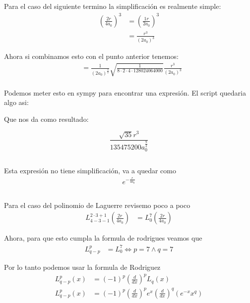 \documentclass{report}
\begin{document}
\subsection{}

Para el caso del siguiente termino la simplificación es realmente simple:
\begin{align*}
	\left( \frac{2 r}{4 a_0} \right)^3 &= \left( \frac{1 r}{2 a_0} \right)^3\\
	&= \frac{r^3}{\left( 2 a_0 \right)^{3}}
\end{align*}

Ahora si combinamos esto con el punto anterior tenemos:
\begin{align*}
	&= \frac{1}{\left( 2 a_0\right)^{\frac{3}{2}}} \sqrt{\frac{1}{8 \cdot 2 \cdot 4 \cdot 128024064000}} \frac{r^3}{\left( 2a_0 \right)^3}\\
\end{align*}

Podemos meter esto en sympy para encontrar una expresión. El script quedaria algo asi:


Que nos da como resultado:

\[
	\frac{\sqrt{35} r^{3}}{135475200 a_{0}^{\frac{9}{2}}}
\]

\subsection{}

Esta expresión no tiene simplificación, va a quedar como
\begin{align*}
	e^{- \frac{r}{4 a_0}}
\end{align*}

\subsection{}
Para el caso del polinomio de Laguerre revisemo poco a poco
\begin{align*}
	L_{4 - 3 - 1}^{2\cdot3 + 1} \left( \frac{2r}{4 a_0} \right) &= L_{0}^{7}\left( \frac{2r}{4 a_0} \right)
\end{align*}

Ahora, para que esto cumpla la formula de rodrigues veamos que
\begin{align*}
	L_{q - p}^{p} &= L_{0}^{7} \iff p = 7 \land q = 7
\end{align*}

Por lo tanto podemos usar la formula de Rodriguez
\begin{align*}
	L_{q - p}^{p} \left( x \right) &= \left( -1 \right)^p \left( \frac{d}{dx} \right)^p L_q \left( x \right)\\
	L_{q - p}^{p} \left( x \right) &= \left( -1 \right)^p \left( \frac{d}{dx} \right)^p e^x \left( \frac{d}{dx} \right)^q \left( e^{-x} x^q \right)\\
\end{align*}
\end{document}
